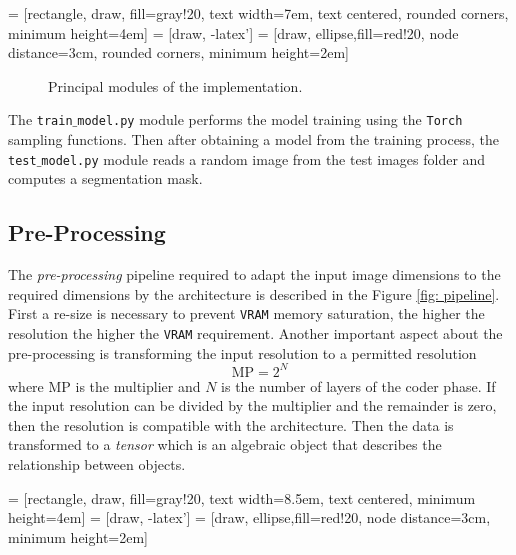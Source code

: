  = [rectangle, draw, fill=gray!20, 
    text width=7em, text centered, rounded corners, minimum height=4em]
 = [draw, -latex']
 = [draw, ellipse,fill=red!20, node distance=3cm, rounded corners,
    minimum height=2em]

\begin{figure}[h]
    \centering
    \caption{Principal modules of the implementation.}
    \label{fig: modules}
\end{figure}
The \texttt{train$\_$model.py} module performs the model training using the \texttt{Torch} sampling functions. Then after obtaining a model from the training process, the \texttt{test$\_$model.py} module reads a random image from the test images folder and computes a segmentation mask.  


\subsection{Pre-Processing}
The \emph{pre-processing} pipeline required to adapt the input image dimensions to the required dimensions by the architecture is described in the Figure \ref{fig: pipeline}. First a re-size is necessary to prevent \texttt{VRAM} memory saturation, the higher the resolution the higher the \texttt{VRAM} requirement. Another important aspect about the pre-processing is transforming the input resolution to a permitted resolution
\begin{equation}
  \text{MP} = 2^N  
\end{equation}
where $\text{MP}$ is the multiplier and $N$ is the number of layers of the coder phase. If the input resolution can be divided by the multiplier and the remainder is zero, then the resolution is compatible with the architecture. Then the data is transformed to a \emph{tensor} which is an algebraic object that describes the relationship between objects.

 = [rectangle, draw, fill=gray!20, 
    text width=8.5em, text centered, minimum height=4em]
 = [draw, -latex']
 = [draw, ellipse,fill=red!20, node distance=3cm,
    minimum height=2em]

